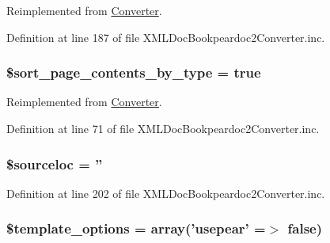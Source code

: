 \-Reimplemented from \hyperlink{class_converter_a40eea215f3b8eaec5c134f45f62aa100}{\-Converter}.



\-Definition at line 187 of file \-X\-M\-L\-Doc\-Bookpeardoc2\-Converter.\-inc.

\hypertarget{class_x_m_l_doc_bookpeardoc2_converter_ab5dae87e1968b35e37687a763216a835}{
\subsubsection[{\$sort\-\_\-page\-\_\-contents\-\_\-by\-\_\-type}]{\setlength{\rightskip}{0pt plus 5cm}\$sort\-\_\-page\-\_\-contents\-\_\-by\-\_\-type = true}}\label{class_x_m_l_doc_bookpeardoc2_converter_ab5dae87e1968b35e37687a763216a835}


\-Reimplemented from \hyperlink{class_converter_ab5dae87e1968b35e37687a763216a835}{\-Converter}.



\-Definition at line 71 of file \-X\-M\-L\-Doc\-Bookpeardoc2\-Converter.\-inc.

\hypertarget{class_x_m_l_doc_bookpeardoc2_converter_a9658cd0f27d80c5ba9b9c7d3b9ba4609}{
\subsubsection[{\$sourceloc}]{\setlength{\rightskip}{0pt plus 5cm}\$sourceloc = ''}}\label{class_x_m_l_doc_bookpeardoc2_converter_a9658cd0f27d80c5ba9b9c7d3b9ba4609}


\-Definition at line 202 of file \-X\-M\-L\-Doc\-Bookpeardoc2\-Converter.\-inc.

\hypertarget{class_x_m_l_doc_bookpeardoc2_converter_a9e8e3182b20bb595bfe9186d97b57bb2}{
\subsubsection[{\$template\-\_\-options}]{\setlength{\rightskip}{0pt plus 5cm}\$template\-\_\-options = array('usepear' =$>$ false)}}\label{class_x_m_l_doc_bookpeardoc2_converter_a9e8e3182b20bb595bfe9186d97b57bb2}


